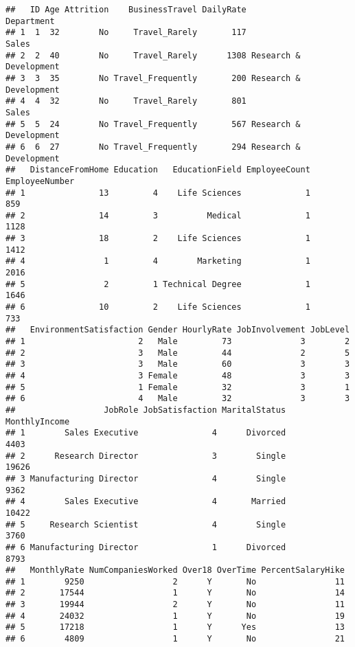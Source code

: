 \documentclass[
]{article}
\begin{document}
\begin{verbatim}
##   ID Age Attrition    BusinessTravel DailyRate             Department
## 1  1  32        No     Travel_Rarely       117                  Sales
## 2  2  40        No     Travel_Rarely      1308 Research & Development
## 3  3  35        No Travel_Frequently       200 Research & Development
## 4  4  32        No     Travel_Rarely       801                  Sales
## 5  5  24        No Travel_Frequently       567 Research & Development
## 6  6  27        No Travel_Frequently       294 Research & Development
##   DistanceFromHome Education   EducationField EmployeeCount EmployeeNumber
## 1               13         4    Life Sciences             1            859
## 2               14         3          Medical             1           1128
## 3               18         2    Life Sciences             1           1412
## 4                1         4        Marketing             1           2016
## 5                2         1 Technical Degree             1           1646
## 6               10         2    Life Sciences             1            733
##   EnvironmentSatisfaction Gender HourlyRate JobInvolvement JobLevel
## 1                       2   Male         73              3        2
## 2                       3   Male         44              2        5
## 3                       3   Male         60              3        3
## 4                       3 Female         48              3        3
## 5                       1 Female         32              3        1
## 6                       4   Male         32              3        3
##                  JobRole JobSatisfaction MaritalStatus MonthlyIncome
## 1        Sales Executive               4      Divorced          4403
## 2      Research Director               3        Single         19626
## 3 Manufacturing Director               4        Single          9362
## 4        Sales Executive               4       Married         10422
## 5     Research Scientist               4        Single          3760
## 6 Manufacturing Director               1      Divorced          8793
##   MonthlyRate NumCompaniesWorked Over18 OverTime PercentSalaryHike
## 1        9250                  2      Y       No                11
## 2       17544                  1      Y       No                14
## 3       19944                  2      Y       No                11
## 4       24032                  1      Y       No                19
## 5       17218                  1      Y      Yes                13
## 6        4809                  1      Y       No                21

\end{verbatim}
\end{document}
